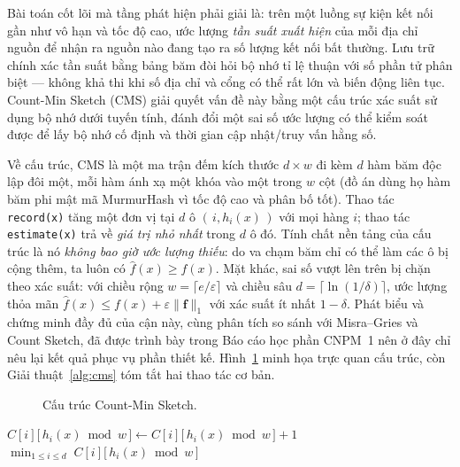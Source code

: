 Bài toán cốt lõi mà tầng phát hiện phải giải là: trên một luồng sự kiện kết nối
gần như vô hạn và tốc độ cao, ước lượng \emph{tần suất xuất hiện} của mỗi địa chỉ
nguồn để nhận ra nguồn nào đang tạo ra số lượng kết nối bất thường. Lưu trữ chính
xác tần suất bằng bảng băm đòi hỏi bộ nhớ tỉ lệ thuận với số phần tử phân biệt ---
không khả thi khi số địa chỉ và cổng có thể rất lớn và biến động liên tục. Count-Min
Sketch (CMS) \cite{cormode2005cms} giải quyết vấn đề này bằng một cấu trúc xác suất
sử dụng bộ nhớ dưới tuyến tính, đánh đổi một sai số ước lượng có thể kiểm soát được
để lấy bộ nhớ cố định và thời gian cập nhật/truy vấn hằng số.

Về cấu trúc, CMS là một ma trận đếm kích thước $d \times w$ đi kèm $d$ hàm băm độc
lập đôi một, mỗi hàm ánh xạ một khóa vào một trong $w$ cột (đồ án dùng họ hàm băm
phi mật mã MurmurHash \cite{appleby2011murmur} vì tốc độ cao và phân bố tốt). Thao
tác \texttt{record(x)} tăng một đơn vị tại $d$ ô $(\,i, h_i(x)\,)$ với mọi hàng $i$;
thao tác \texttt{estimate(x)} trả về \emph{giá trị nhỏ nhất} trong $d$ ô đó. Tính
chất nền tảng của cấu trúc là nó \emph{không bao giờ ước lượng thiếu}: do va chạm
băm chỉ có thể làm các ô bị cộng thêm, ta luôn có $\hat{f}(x) \ge f(x)$. Mặt khác,
sai số vượt lên trên bị chặn theo xác suất: với chiều rộng $w = \lceil e/\varepsilon \rceil$
và chiều sâu $d = \lceil \ln(1/\delta) \rceil$, ước lượng thỏa mãn
$\hat{f}(x) \le f(x) + \varepsilon \lVert \mathbf{f} \rVert_1$ với xác suất ít nhất
$1-\delta$. Phát biểu và chứng minh đầy đủ của cận này, cùng phân tích so sánh với
Misra--Gries và Count Sketch, đã được trình bày trong Báo cáo học phần CNPM~1 nên ở
đây chỉ nêu lại kết quả phục vụ phần thiết kế. Hình~\ref{fig:cms} minh họa trực quan
cấu trúc, còn Giải thuật~\ref{alg:cms} tóm tắt hai thao tác cơ bản.

\begin{figure}[H]
  \centering
  \resizebox{0.8\linewidth}{!}{}
  \caption{Cấu trúc Count-Min Sketch.}
  \label{fig:cms}
\end{figure}

\begin{algorithm}[H]
\caption{Count-Min Sketch --- cập nhật và truy vấn}
\label{alg:cms}
\begin{algorithmic}[1]
    \State $C[i]\big[\,h_i(x) \bmod w\,\big] \gets C[i]\big[\,h_i(x) \bmod w\,\big] + 1$
  \EndFor
\EndFunction
{}
  \State \Return $\min_{1 \le i \le d} \; C[i]\big[\,h_i(x) \bmod w\,\big]$
\EndFunction
\end{algorithmic}
\end{algorithm}

